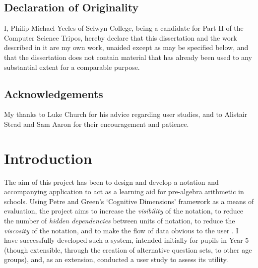 \documentclass[12pt,twoside,notitlepage,xetex]{report}
\begin{document}
\newpage
\section*{Declaration of Originality}

I, Philip Michael Yeeles of Selwyn College, being a candidate for Part
II of the Computer Science Tripos, hereby declare that this dissertation
and the work described in it are my own work, unaided except as may be
specified below, and that the dissertation does not contain material
that has already been used to any substantial extent for a comparable
purpose.

\bigskip
{}

\medskip
{}

\cleardoublepage

\tableofcontents

\listoffigures

\newpage
\section*{Acknowledgements}
My thanks to Luke Church for his advice regarding user studies, and to Alistair
Stead and Sam Aaron for their encouragement and patience.


\cleardoublepage        %

\setcounter{page}{1}
\pagestyle{headings}

\chapter{Introduction}

The aim of this project has been to design and develop a notation and accompanying application to act as a learning aid for pre-algebra arithmetic in schools.  Using Petre and Green's `Cognitive Dimensions' framework as a means of evaluation, the project aims to increase the \emph{visibility} of the notation, to reduce the number of \emph{hidden dependencies} between units of notation, to reduce the \emph{viscosity} of the notation, and to make the flow of data obvious to the user \cite{Green1996}.  I have successfully developed such a system, intended initially for pupils in Year 5 (though extensible, through the creation of alternative question sets, to other age groups), and, as an extension, conducted a user study to assess its utility.
\end{document}
